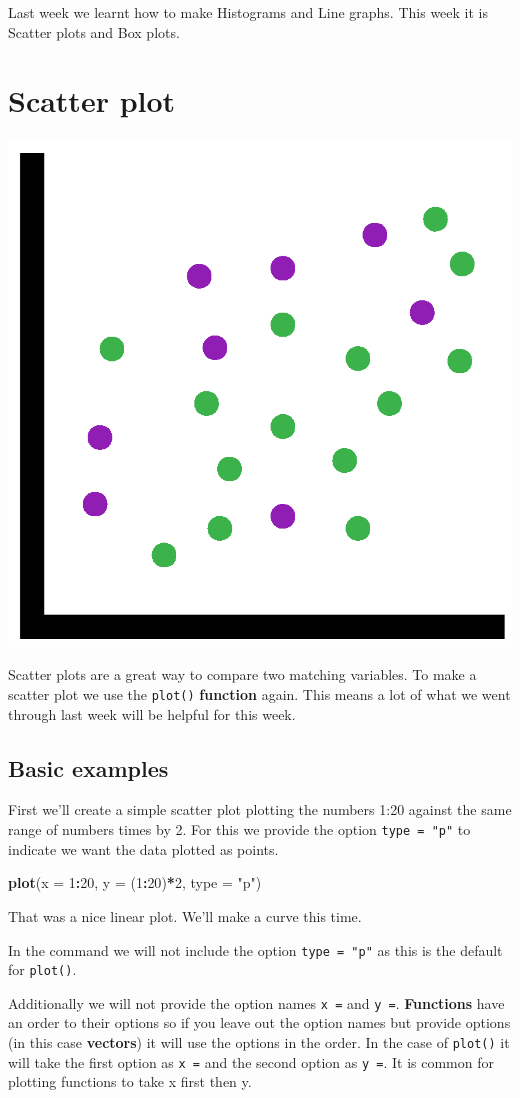 \documentclass[]{book}
\newenvironment{Shaded}{\begin{snugshade}}{\end{snugshade}}
\newcommand{\KeywordTok}[1]{\textcolor[rgb]{0.13,0.29,0.53}{\textbf{#1}}}
\newcommand{\DataTypeTok}[1]{\textcolor[rgb]{0.13,0.29,0.53}{#1}}
\newcommand{\DecValTok}[1]{\textcolor[rgb]{0.00,0.00,0.81}{#1}}
\newcommand{\StringTok}[1]{\textcolor[rgb]{0.31,0.60,0.02}{#1}}
\newcommand{\OperatorTok}[1]{\textcolor[rgb]{0.81,0.36,0.00}{\textbf{#1}}}
\newcommand{\NormalTok}[1]{#1}
\begin{document}
Last week we learnt how to make Histograms and Line graphs. This week it
is Scatter plots and Box plots.

\section{Scatter plot}\label{scatter-plot}

\begin{center}\includegraphics[width=0.2\linewidth]{figures/Scatterplot_2} \end{center}

Scatter plots are a great way to compare two matching variables. To make
a scatter plot we use the \texttt{plot()} \textbf{function} again. This
means a lot of what we went through last week will be helpful for this
week.

\subsection{Basic examples}\label{basic-examples}

First we'll create a simple scatter plot plotting the numbers 1:20
against the same range of numbers times by 2. For this we provide the
option \texttt{type\ =\ "p"} to indicate we want the data plotted as
points.

\begin{Shaded}
\begin{Highlighting}[]
\KeywordTok{plot}\NormalTok{(}\DataTypeTok{x =} \DecValTok{1}\OperatorTok{:}\DecValTok{20}\NormalTok{, }\DataTypeTok{y =}\NormalTok{ (}\DecValTok{1}\OperatorTok{:}\DecValTok{20}\NormalTok{)}\OperatorTok{*}\DecValTok{2}\NormalTok{, }\DataTypeTok{type =} \StringTok{"p"}\NormalTok{)}
\end{Highlighting}
\end{Shaded}

That was a nice linear plot. We'll make a curve this time.

In the command we will not include the option \texttt{type\ =\ "p"} as
this is the default for \texttt{plot()}.

Additionally we will not provide the option names \texttt{x\ =} and
\texttt{y\ =}. \textbf{Functions} have an order to their options so if
you leave out the option names but provide options (in this case
\textbf{vectors}) it will use the options in the order. In the case of
\texttt{plot()} it will take the first option as \texttt{x\ =} and the
second option as \texttt{y\ =}. It is common for plotting functions to
take x first then y.
\end{document}
